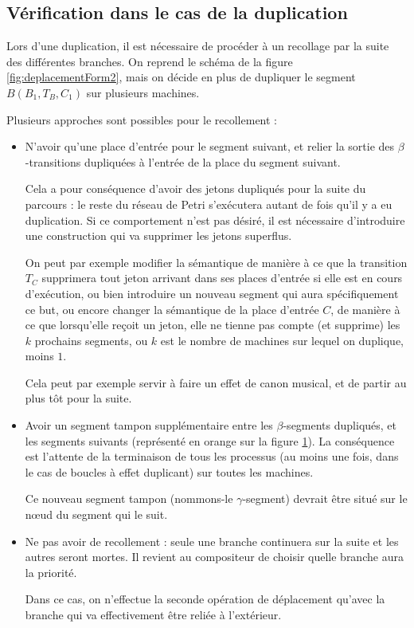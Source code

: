 \subsection{Vérification dans le cas de la duplication}
\label{section:synchroPetri}
Lors d'une duplication, il est nécessaire de procéder à un recollage par la suite des différentes branches. On reprend le schéma de la figure \ref{fig:deplacementForm2}, mais on décide en plus de dupliquer le segment $B(B_1, T_B, C_1)$ sur plusieurs machines.

Plusieurs approches sont possibles pour le recollement : 
\begin{itemize}
\item N'avoir qu'une place d'entrée pour le segment suivant, et relier la sortie des $\beta$-transitions dupliquées à l'entrée de la place du segment suivant.

Cela a pour conséquence d'avoir des jetons dupliqués pour la suite du parcours : le reste du réseau de Petri s'exécutera autant de fois qu'il y a eu duplication. Si ce comportement n'est pas désiré, il est nécessaire d'introduire une construction qui va supprimer les jetons superflus. 

On peut par exemple modifier la sémantique de manière à ce que la transition $T_C$ supprimera tout jeton arrivant dans ses places d'entrée si elle est en cours d'exécution, ou bien introduire un nouveau segment qui aura spécifiquement ce but, ou encore changer la sémantique de la place d'entrée $C$, de manière à ce que lorsqu'elle reçoit un jeton, elle ne tienne pas compte (et supprime) les $k$ prochains segments, ou $k$ est le nombre de machines sur lequel on duplique, moins $1$.

Cela peut par exemple servir à faire un effet de canon musical, et de partir au plus tôt pour la suite.

\item Avoir un segment tampon supplémentaire entre les $\beta$-segments dupliqués, et les segments suivants (représenté en orange sur la figure \ref{fig:duplicationEtRecoll}).
La conséquence est l'attente de la terminaison de tous les processus (au moins une fois, dans le cas de boucles à effet duplicant) sur toutes les machines.

Ce nouveau segment tampon (nommons-le $\gamma$-segment) devrait être situé sur le nœud du segment qui le suit.
\item Ne pas avoir de recollement : seule une branche continuera sur la suite et les autres seront mortes. Il revient au compositeur de choisir quelle branche aura la priorité.

Dans ce cas, on n'effectue la seconde opération de déplacement qu'avec la branche qui va effectivement être reliée à l'extérieur.
\end{itemize}

\begin{figure}[h!]
\centering

\label{fig:duplicationEtRecoll}
\end{figure}
